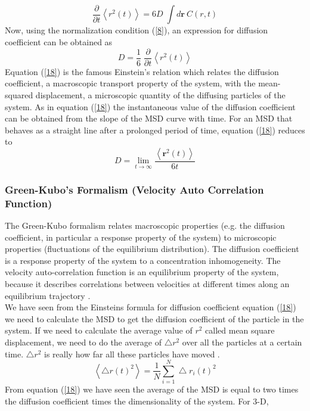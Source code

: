  \begin{equation}
 \frac{\partial}{\partial t} \left\langle r^2(t) \right\rangle = 6D \; \int d\textbf{r}~C(r,t)
 \end{equation}
 \noindent Now, using the normalization condition (\ref{8}), an expression for diffusion coefficient can be obtained as
 \begin{equation}\label{18}
 D = \frac{1}{6}\;\frac{\partial}{\partial t} \left\langle r^2(t) \right\rangle
 \end{equation} 
 \noindent Equation (\ref{18}) is the famous Einstein's relation which relates the diffusion coefficient, a macroscopic transport property of the system, with the mean-squared displacement, a microscopic quantity of the diffusing particles of the system. As in equation (\ref{18}) the instantaneous value of the diffusion coefficient can be obtained from the slope of the MSD curve with time. For an MSD that behaves as a straight line after a prolonged period of time, equation (\ref{18}) reduces to
 \begin{equation}
 D = \lim \limits_{t \to \infty} \frac{\left\langle \textbf{r}^2(t) \right\rangle}{6 t}
 \end{equation}
 
 \subsubsection{Green-Kubo's Formalism (Velocity Auto Correlation Function)}
 The Green-Kubo formalism relates macroscopic properties (e.g. the diffusion coefficient, in particular a response property of the system) to microscopic properties (fluctuations of the equilibrium distribution). The diffusion coefficient is a response property of the system to a concentration inhomogeneity. The velocity auto-correlation function is an equilibrium property of the system, because it describes correlations between velocities at different times along an equilibrium trajectory \cite{smit}.\\ 
 
 \noindent We have seen from the Einsteins formula for diffusion coefficient equation (\ref{18}) we need to calculate the MSD to get the diffusion coefficient of the particle in the system. If we need to calculate the average value of $r^2$ called mean square displacement, we need to do the average of $\bigtriangleup r^2$ over all the particles at a certain time. $\bigtriangleup r^2$ is really how far all these particles have moved \cite{ishwordai}.
 \begin{equation}
 \left\langle \bigtriangleup r(t)^2 \right\rangle = \frac{1}{N} \sum_{i=1}^N \bigtriangleup r_i(t)^2
 \end{equation}
 \noindent From equation (\ref{18}) we have seen the average of the MSD is equal to two times the diffusion coefficient times the dimensionality of the system. For 3-D,
 
